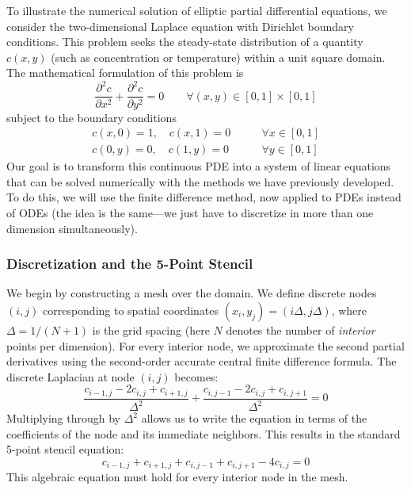 To illustrate the numerical solution of elliptic partial differential equations, we consider the two-dimensional Laplace equation with Dirichlet boundary conditions. This problem seeks the steady-state distribution of a quantity $c(x,y)$ (such as concentration or temperature) within a unit square domain. The mathematical formulation of this problem is
\begin{equation}
    \frac{\partial^2 c}{\partial x^2} + \frac{\partial^2 c}{\partial y^2} = 0 \qquad \forall(x, y) \in [0, 1] \times [0, 1]
\end{equation}
subject to the boundary conditions
\begin{equation}
    \begin{aligned}
        c(x, 0) = 1, \quad c(x, 1) = 0 & \qquad \forall x \in [0, 1] \\
        c(0, y) = 0, \quad c(1, y) = 0 & \qquad \forall y \in [0, 1]
    \end{aligned}
\end{equation}
Our goal is to transform this continuous PDE into a system of linear equations that can be solved numerically with the methods we have previously developed. To do this, we will use the finite difference method, now applied to PDEs instead of ODEs (the idea is the same---we just have to discretize in more than one dimension simultaneously).

\subsubsection{Discretization and the 5-Point Stencil}

We begin by constructing a mesh over the domain. We define discrete nodes $(i, j)$ corresponding to spatial coordinates $(x_i, y_j) = (i\Delta, j\Delta)$, where $\Delta = 1/(N+1)$ is the grid spacing (here $N$ denotes the number of \textit{interior} points per dimension). For every interior node, we approximate the second partial derivatives using the second-order accurate central finite difference formula. The discrete Laplacian at node $(i,j)$ becomes:
\begin{equation}
    \frac{c_{i-1,j} - 2c_{i,j} + c_{i+1,j}}{\Delta^2} + \frac{c_{i,j-1} - 2c_{i,j} + c_{i,j+1}}{\Delta^2} = 0
\end{equation}
Multiplying through by $\Delta^2$ allows us to write the equation in terms of the coefficients of the node and its immediate neighbors. This results in the standard 5-point stencil equation:
\begin{equation}
    c_{i-1,j} + c_{i+1,j} + c_{i,j-1} + c_{i,j+1} - 4c_{i,j} = 0
\end{equation}
This algebraic equation must hold for every interior node in the mesh.


